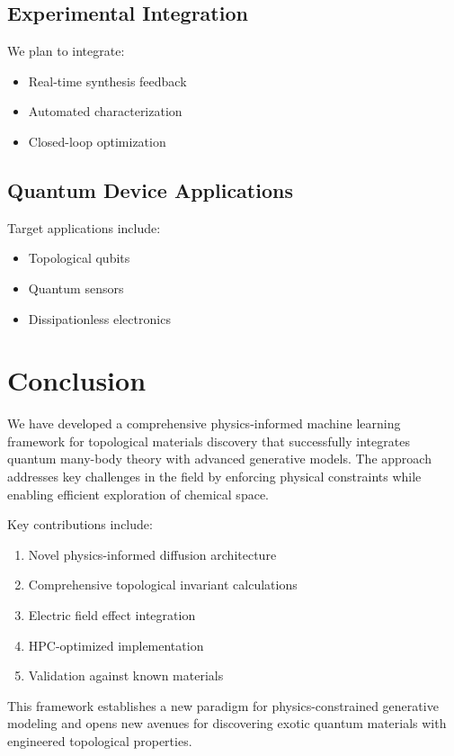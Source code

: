 \documentclass[12pt,a4paper]{article}
\begin{document}
\subsection{Experimental Integration}

We plan to integrate:
\begin{itemize}
\item Real-time synthesis feedback
\item Automated characterization
\item Closed-loop optimization
\end{itemize}

\subsection{Quantum Device Applications}

Target applications include:
\begin{itemize}
\item Topological qubits
\item Quantum sensors
\item Dissipationless electronics
\end{itemize}

\section{Conclusion}

We have developed a comprehensive physics-informed machine learning framework for topological materials discovery that successfully integrates quantum many-body theory with advanced generative models. The approach addresses key challenges in the field by enforcing physical constraints while enabling efficient exploration of chemical space.

Key contributions include:
\begin{enumerate}
\item Novel physics-informed diffusion architecture
\item Comprehensive topological invariant calculations
\item Electric field effect integration
\item HPC-optimized implementation
\item Validation against known materials
\end{enumerate}

This framework establishes a new paradigm for physics-constrained generative modeling and opens new avenues for discovering exotic quantum materials with engineered topological properties.
\end{document}
